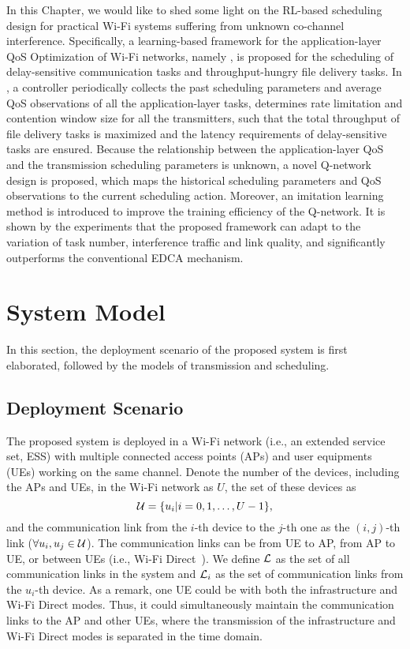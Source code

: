 In this Chapter, we would like to shed some light on the RL-based scheduling design for practical Wi-Fi systems suffering from unknown co-channel interference. Specifically, a learning-based framework for the application-layer QoS Optimization of Wi-Fi networks, namely {\algName}, is proposed for the scheduling of delay-sensitive communication tasks and throughput-hungry file delivery tasks. In {\algName}, a controller periodically collects the past scheduling parameters and average QoS observations of all the application-layer tasks, determines rate limitation and contention window size for all the transmitters, such that the total throughput of file delivery tasks is maximized and the latency requirements of delay-sensitive tasks are ensured. Because the relationship between the application-layer QoS and the transmission scheduling parameters is unknown, a novel Q-network design is proposed, which maps the historical scheduling parameters and QoS observations to the current scheduling action. Moreover, an imitation learning method is introduced to improve the training efficiency of the Q-network. It is shown by the experiments that the proposed framework can adapt to the variation of task number, interference traffic and link quality, and significantly outperforms the conventional EDCA mechanism.

\section{System Model}
In this section, the deployment scenario of the proposed {\algName} system is first elaborated, followed by the models of transmission and scheduling.

\subsection{Deployment Scenario}
\label{sec:Deployment Scenario}

The proposed {\algName} system is deployed in a Wi-Fi network (i.e., an extended service set, ESS) with multiple connected access points (APs) and user equipments (UEs) working on the same channel. Denote the number of the devices, including the APs and UEs, in the Wi-Fi network as $U$, the set of these devices as
\begin{equation}
    \mathcal{U} =\{u_{i}|{i}=0, 1, \ldots, U-1\},
\end{equation}
and the communication link from the $i$-th device to the $j$-th one as the {$(i,j)$}-th link ($\forall u_{i}, u_{j} \in \mathcal{U}$). The communication links can be from UE to AP, from AP to UE, or between UEs (i.e., Wi-Fi Direct~\cite{alliance2009wi}). We define $\mathcal{L}$ as the set of all communication links in the system and $\mathcal{L}_{i} $ as the set of communication links from the $u_{i}$-th device. As a remark, one UE could be with both the infrastructure and Wi-Fi Direct modes. Thus, it could simultaneously maintain the communication links to the AP and other UEs, where the transmission of the infrastructure and Wi-Fi Direct modes is separated in the time domain.

